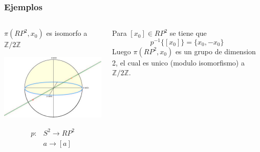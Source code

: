 \documentclass[xetex,mathserif,serif]{beamer}
\begin{document}
  \begin{frame}
    \frametitle{Ejemplos}
    \begin{columns}
      \begin{column}{0.4\textwidth}
        \(\pi (RP^2, x_0)\) es isomorfo a \(\mathbb Z / 2 \mathbb Z\) \\
        \begin{center}
          \includegraphics[scale=0.3]{./imag/rpsphere.jpg}
        \end{center}
        \begin{align*}
          p : &S^2 \to RP^2 \\
          &a \to [a]
        \end{align*}
      \end{column}
      \begin{column}{0.6\textwidth}
        Para \([x_0] \in RP^2\) se tiene que
        \[ p^{-1} \{[x_0]\} = \{ x_0 , - x_0\} \]
        Luego \(\pi (RP^2, x_0)\) es un grupo de dimension 2, el cual es
        unico (modulo isomorfismo) a \(\mathbb Z / 2 \mathbb Z\).
      \end{column}
    \end{columns}
  \end{frame}
\end{document}
